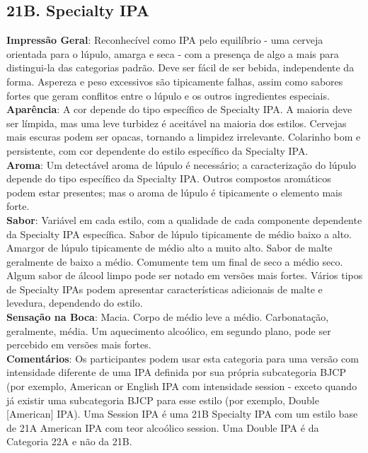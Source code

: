 \subsection*{21B. Specialty IPA}
\textbf{Impressão Geral}: Reconhecível como IPA pelo equilíbrio - uma cerveja orientada para o lúpulo, amarga e seca - com a presença de algo a mais para distingui-la das categorias padrão. Deve ser fácil de ser bebida, independente da forma. Aspereza e peso excessivos são tipicamente falhas, assim como sabores fortes que geram conflitos entre o lúpulo e os outros ingredientes especiais. \\
\textbf{Aparência}: A cor depende do tipo específico de Specialty IPA. A maioria deve ser límpida, mas uma leve turbidez é aceitável na maioria dos estilos. Cervejas mais escuras podem ser opacas, tornando a limpidez irrelevante. Colarinho bom e persistente, com cor dependente do estilo específico da Specialty IPA. \\
\textbf{Aroma}: Um detectável aroma de lúpulo é necessário; a caracterização do lúpulo depende do tipo específico da Specialty IPA. Outros compostos aromáticos podem estar presentes; mas o aroma de lúpulo é tipicamente o elemento mais forte. \\
\textbf{Sabor}: Variável em cada estilo, com a qualidade de cada componente dependente da Specialty IPA específica. Sabor de lúpulo tipicamente de médio baixo a alto. Amargor de lúpulo tipicamente de médio alto a muito alto. Sabor de malte geralmente de baixo a médio. Comumente tem um final de seco a médio seco. Algum sabor de álcool limpo pode ser notado em versões mais fortes. Vários tipos de Specialty IPAs podem apresentar características adicionais de malte e levedura, dependendo do estilo. \\
\textbf{Sensação na Boca}: Macia. Corpo de médio leve a médio. Carbonatação, geralmente, média. Um aquecimento alcoólico, em segundo plano, pode ser percebido em versões mais fortes. \\
\textbf{Comentários}: Os participantes podem usar esta categoria para uma versão com intensidade diferente de uma IPA definida por sua própria subcategoria BJCP (por exemplo, American or English IPA com intensidade session - exceto quando já existir uma subcategoria BJCP para esse estilo (por exemplo, Double [American] IPA). Uma Session IPA é uma 21B Specialty IPA com um estilo base de 21A American IPA com teor alcoólico session. Uma Double IPA é da Categoria 22A e não da 21B. \\
